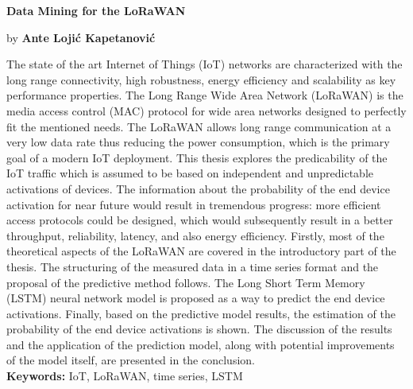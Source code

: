 \thispagestyle{plain}
\begin{center}       
    \large
    \vspace{0.9cm}
    \textbf{Data Mining for the LoRaWAN}
        
    \vspace{0.4cm}
    by \textbf{Ante Lojić Kapetanović}
    
\end{center}
The state of the art Internet of Things (IoT) networks are characterized with the long range connectivity, high robustness, energy efficiency and scalability as key performance properties.
The Long Range Wide Area Network (LoRaWAN) is the media access control (MAC) protocol for wide area networks designed to perfectly fit the mentioned needs. 
The LoRaWAN allows long range communication at a very low data rate thus reducing the power consumption, which is the primary goal of a modern IoT deployment.
This thesis explores the predicability of the IoT traffic which is assumed to be based on independent and unpredictable activations of devices.
The information about the probability of the end device activation for near future would result in tremendous progress: more efficient access protocols could be designed, which would subsequently result in a better throughput, reliability, latency, and also energy efficiency.
Firstly, most of the theoretical aspects of the LoRaWAN are covered in the introductory part of the thesis.
The structuring of the measured data in a time series format and the proposal of the predictive method follows.
The Long Short Term Memory (LSTM) neural network model is proposed as a way to predict the end device activations.
Finally, based on the predictive model results, the estimation of the probability of the end device activations is shown.
The discussion of the results and the application of the prediction model, along with potential improvements of the model itself, are presented in the conclusion.\\

\textbf{Keywords:} IoT, LoRaWAN, time series, LSTM
